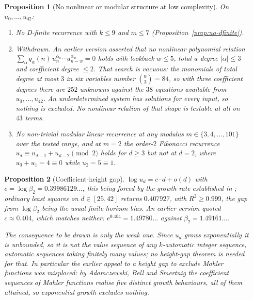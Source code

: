 \documentclass[11pt,a4paper]{article}
\newtheorem{proposition}{Proposition}
\theoremstyle{remark}
\theoremstyle{plain}
\begin{document}
\begin{proposition}[No nonlinear or modular structure at low complexity]
\label{prop:no-recurrence-strong}
On $u_0, \ldots, u_{42}$:
\begin{enumerate}
\item[\textnormal{(i)}] No D-finite recurrence with $k \le 9$ and
$m \le 7$ (Proposition~\ref{prop:no-dfinite}).
\item[\textnormal{(ii)}] \emph{Withdrawn.} An earlier version asserted
that no nonlinear polynomial relation
$\sum_\alpha q_\alpha(n)\,u_n^{\alpha_0}\cdots u_{n-w}^{\alpha_w} = 0$
holds with lookback $w \le 5$, total $u$-degree $|\alpha| \le 3$ and
coefficient degree $\le 2$. That search is vacuous: the monomials of
total degree at most $3$ in six variables number
$\binom{9}{3} = 84$, so with three coefficient degrees there are $252$
unknowns against the $38$ equations available from
$u_0,\ldots,u_{42}$. An underdetermined system has solutions for every
input, so nothing is excluded. No nonlinear relation of that shape is
testable at all on $43$ terms.
\item[\textnormal{(iii)}] No non-trivial modular linear recurrence at
any modulus $m \in \{3, 4, \ldots, 101\}$ over the tested range, and at
$m = 2$ the order-$2$ Fibonacci recurrence
$u_d \equiv u_{d-1} + u_{d-2} \pmod 2$ holds for $d \ge 3$ but
\emph{not} at $d = 2$, where $u_0 + u_1 = 4 \equiv 0$ while
$u_2 = 5 \equiv 1$.
\end{enumerate}
\end{proposition}

\begin{proposition}[Coefficient-height gap]
\label{prop:height-gap}
$\log u_d = c \cdot d + o(d)$ with $c = \log \beta_2 = 0.39986129\ldots$,
this being forced by the growth rate established in \cite{Bonfioli2};
ordinary least squares on $d \in [25,42]$ returns $0.407927$, with
$R^2 \ge 0.999$, the gap from $\log\beta_2$ being the usual finite-horizon
bias. An earlier version quoted $c \approx 0.404$, which matches neither:
$e^{0.404} = 1.49780\ldots$ against $\beta_2 = 1.49161\ldots$.

The consequence to be drawn is only the weak one. Since $u_d$ grows
exponentially it is unbounded, so it is not the value sequence of any
$k$-automatic integer sequence, automatic sequences taking finitely many
values; no height-gap theorem is needed for that. In particular the
earlier appeal to a height gap to exclude Mahler functions was
misplaced: by Adamczewski, Bell and Smertnig \cite{ABS} the coefficient sequences of
Mahler functions realise five distinct growth behaviours, all of them
attained, so exponential growth excludes nothing.
\end{proposition}
\end{document}
